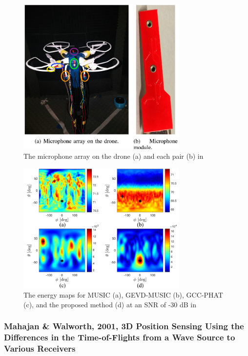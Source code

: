 \documentclass[notitlepage]{report}
\begin{document}
\begin{figure}[H]
\includegraphics[width=0.75\textwidth]{./manamperi_2022/array.png}
\centering
\caption{The microphone array on the drone (a) and each pair (b) in \cite{manamperi_drone_2022}}
\label{fig:manamperi_2022_array}
\centering
\end{figure}

\begin{figure}[H]
\includegraphics[width=0.75\textwidth]{./manamperi_2022/map_n30.png}
\centering
\caption{The energy maps for MUSIC (a), GEVD-MUSIC (b), GCC-PHAT (c), and the proposed method (d) at an SNR of -30 \si{dB} in \cite{manamperi_drone_2022}}
\label{fig:manamperi_2022_map_n30}
\centering
\end{figure}

\subsubsection{Mahajan \& Walworth, 2001, 3D Position Sensing Using the Differences in the Time-of-Flights from a Wave Source to Various Receivers}
\end{document}
